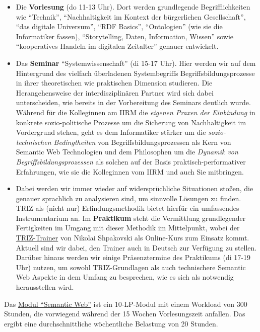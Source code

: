 \documentclass[11pt,a4paper]{article}
\begin{document}
\begin{itemize}
\item
  Die \textbf{Vorlesung} (do 11-13 Uhr). Dort werden grundlegende
  Begrifflichkeiten wie ``Technik'', ``Nachhaltigkeit im Kontext der
  bürgerlichen Gesellschaft'', ``das digitale Universum'', ``RDF
  Basics'', ``Ontologien'' (wie sie die Informatiker fassen),
  ``Storytelling, Daten, Information, Wissen'' sowie ``kooperatives
  Handeln im digitalen Zeitalter'' genauer entwickelt.
\item
  Das \textbf{Seminar} ``Systemwissenschaft'' (di 15-17 Uhr). Hier
  werden wir auf dem Hintergrund des vielfach überladenen Systembegriffs
  Begriffsbildungsprozesse in ihrer theoretischen wie praktischen
  Dimension studieren. Die Herangehensweise der interdisziplinären
  Partner wird sich dabei unterscheiden, wie bereits in der Vorbereitung
  des Seminars deutlich wurde. Während für die Kolleginnen am IIRM die
  \emph{eigenen Praxen der Einbindung} in konkrete sozio-politische
  Prozesse um die Sicherung von Nachhaltigkeit im Vordergrund stehen,
  geht es dem Informatiker stärker um die \emph{sozio-technischen
  Bedingtheiten} von Begriffsbildungsprozessen als Kern von Semantic Web
  Technologien und dem Philosophen um die \emph{Dynamik von
  Begriffsbildungsprozessen} als solchen auf der Basis
  praktisch-performativer Erfahrungen, wie sie die Kolleginnen vom IIRM
  und auch Sie mitbringen.
\item
  Dabei werden wir immer wieder auf widersprüchliche Situationen stoßen,
  die genauer sprachlich zu analysieren sind, um sinnvolle Lösungen zu
  finden. TRIZ als (nicht nur) Erfindungsmethodik bietet hierfür ein
  umfassendes Instrumentarium an. Im \textbf{Praktikum} steht die
  Vermittlung grundlegender Fertigkeiten im Umgang mit dieser Methodik
  im Mittelpunkt, wobei der \href{https://triztrainer.ru/}{TRIZ-Trainer}
  von Nikolai Shpakovski als Online-Kurs zum Einsatz kommt. Aktuell sind
  wir dabei, den Trainer auch in Deutsch zur Verfügung zu stellen.
  Darüber hinaus werden wir einige Präsenztermine des Praktikums (di
  17-19 Uhr) nutzen, um sowohl TRIZ-Grundlagen als auch technischere
  Semantic Web Aspekte in dem Umfang zu besprechen, wie es sich als
  notwendig herausstellen wird.
\end{itemize}

Das \href{http://bis.informatik.uni-leipzig.de/de/Lehre/BAMA/SW}{Modul
``Semantic Web''} ist ein 10-LP-Modul mit einem Workload von 300
Stunden, die vorwiegend während der 15 Wochen Vorlesungszeit anfallen.
Das ergibt eine durchschnittliche wöchentliche Belastung von 20 Stunden.
\end{document}
